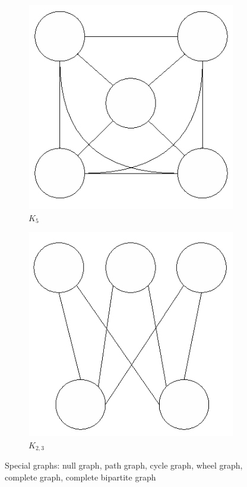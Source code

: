 \begin{figure}
\begin{subfigure}{.26\textwidth}
  \centering
  \includegraphics[width=.8\linewidth]{figs/K5.eps}
  \caption{$K_5$}
  \label{fig:notable-K5}
\end{subfigure}
\begin{subfigure}{.26\textwidth}
  \centering
  \includegraphics[width=.8\linewidth]{figs/K23.eps}
  \caption{$K_{2,3}$}
  \label{fig:notable-K23}
\end{subfigure}
\caption{Special graphs: null graph, path graph, cycle graph, wheel graph, complete graph, complete bipartite graph}
\label{fig:notable}
\end{figure}



